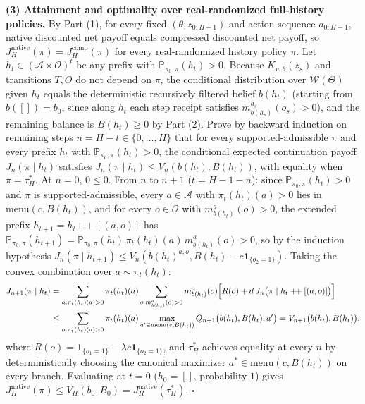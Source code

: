 \documentclass[11pt,a4paper]{article}
\begin{document}
\textbf{(3) Attainment and optimality over real-randomized full-history
policies.} By Part (1), for every fixed \((\theta, z_{0:H-1})\) and
action sequence \(a_{0:H-1}\), native discounted net payoff equals
compressed discounted net payoff, so
\(J_H^{\mathrm{native}}(\pi) = J_H^{\mathrm{comp}}(\pi)\) for every
real-randomized history policy \(\pi\). Let
\(h_t \in (\mathcal{A} \times \mathcal{O})^t\) be any prefix with
\(\mathbb{P}_{\pi_0, \pi}(h_t) > 0\). Because \(K_{w.\theta}(z_s)\) and
transitions \(T, O\) do not depend on \(\pi\), the conditional
distribution over \(\mathcal{W}(\Theta)\) given \(h_t\) equals the
deterministic recursively filtered belief \(b(h_t)\) (starting from
\(b([]) = b_0\), since along \(h_t\) each step receipt satisfies
\(m_{b(h_s)}^{a_s}(o_s) > 0\)), and the remaining balance is
\(B(h_t) \ge 0\) by Part (2). Prove by backward induction on remaining
steps \(n = H - t \in \{0, \dots, H\}\) that for every
supported-admissible \(\pi\) and every prefix \(h_t\) with
\(\mathbb{P}_{\pi_0, \pi}(h_t) > 0\), the conditional expected
continuation payoff \(J_n(\pi \mid h_t)\) satisfies
\(J_n(\pi \mid h_t) \le V_n(b(h_t), B(h_t))\), with equality when
\(\pi = \tau_H^*\). At \(n = 0\), \(0 \le 0\). From \(n\) to \(n+1\)
(\(t = H - 1 - n\)): since \(\mathbb{P}_{\pi_0, \pi}(h_t) > 0\) and
\(\pi\) is supported-admissible, every \(a \in \mathcal{A}\) with
\(\pi_t(h_t)(a) > 0\) lies in \(\mathrm{menu}(c, B(h_t))\), and for
every \(o \in \mathcal{O}\) with \(m_{b(h_t)}^a(o) > 0\), the extended
prefix \(h_{t+1} = h_t \mathbin{+\!+} [(a,o)]\) has
\(\mathbb{P}_{\pi_0, \pi}(h_{t+1}) = \mathbb{P}_{\pi_0, \pi}(h_t)\,\pi_t(h_t)(a)\,m_{b(h_t)}^a(o) > 0\),
so by the induction hypothesis
\(J_n(\pi \mid h_{t+1}) \le V_n(b(h_t)^{a,o}, B(h_t) - c\mathbf{1}_{\{o_2=1\}})\).
Taking the convex combination over \(a \sim \pi_t(h_t)\):
\[\begin{aligned}
J_{n+1}(\pi \mid h_t)
&= \sum_{a : \pi_t(h_t)(a) > 0} \pi_t(h_t)(a) \sum_{o : m_{b(h_t)}^a(o) > 0} m_{b(h_t)}^a(o)\Bigl[R(o) + d\, J_n\bigl(\pi \mid h_t \mathbin{+\!+} [(a,o)]\bigr)\Bigr] \\
&\le \sum_{a : \pi_t(h_t)(a) > 0} \pi_t(h_t)(a) \max_{a' \in \mathrm{menu}(c, B(h_t))} Q_{n+1}\bigl(b(h_t), B(h_t), a'\bigr) = V_{n+1}\bigl(b(h_t), B(h_t)\bigr),
\end{aligned}\] where
\(R(o) = \mathbf{1}_{\{o_1=1\}} - \lambda c \mathbf{1}_{\{o_2=1\}}\),
and \(\tau_H^*\) achieves equality at every \(n\) by deterministically
choosing the canonical maximizer \(a^* \in \mathrm{menu}(c, B(h_t))\) on
every branch. Evaluating at \(t = 0\) (\(h_0 = []\), probability \(1\))
gives
\(J_H^{\mathrm{native}}(\pi) \le V_H(b_0, B_0) = J_H^{\mathrm{native}}(\tau_H^*)\).
\(\square\)
\end{document}
